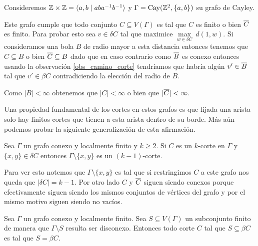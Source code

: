 \documentclass[tesis.tex]{subfiles}
\begin{document}
\begin{ej}
	Consideremos $\mathbb{Z} \times \mathbb{Z} = \langle a,b \mid aba^{-1}b^{-1} \rangle$ y 
	$\Gamma = \text{Cay}(\mathbb{Z}^2, \{ a, b \})$ su grafo de Cayley.
	
	Este grafo cumple que todo conjunto $C \subseteq V(\Gamma)$ es tal que $C$ es finito o bien $\overline C$ es finito.
	Para probar esto sea $v \in \delta C$ tal que
	maximice $\underset{w \in \delta C}{\max} \ d(1,w)$.
	Si consideramos una bola $B$ de radio mayor a esta distancia entonces tenemos que $C \subseteq B$ o bien $\overline C \subseteq B$ dado que en caso contrario como $\overline B$ es conexo entonces usando la observación \ref{obs_camino_corte} tendríamos que habría algún $v' \in \overline B$ tal que $v' \in \beta C$ contradiciendo la elección del radio de $B$.
	
	Como $|B| < \infty$ obtenemos que $|C| < \infty$ o bien que $|\overline C| < \infty$.
\end{ej}

Una propiedad fundamental de los cortes en estos grafos es que fijada una arista solo hay finitos cortes que tienen a esta arista dentro de su borde.	
Más aún podemos probar la siguiente generalización de esta afirmación.

\begin{obs}\label{obs_kCorte_restriccion}
	Sea $\Gamma$ un grafo conexo y localmente finito y $k \ge 2$.
	Si $C$ es un $k$-corte en $\Gamma$ y $\{ x,y  \} \in \delta C$ entonces $\Gamma \setminus \{ x,y \}$ es un $(k-1)$-corte.
	
	Para ver esto notemos que $\Gamma \setminus \{ x,y \}$ es tal que si restringimos $C$ a este grafo nos queda que $|\delta C| = k-1$.
	Por otro lado $C$ y $\overline C$ siguen siendo conexos porque efectivamente siguen siendo los mismos conjuntos de vértices del grafo y por el mismo motivo siguen siendo no vacíos.
\end{obs}



\begin{lema}\label{lema_corte_disconexo_vertices}
	Sea $\Gamma$ un grafo conexo y localmente finito.
	Sea $S \subseteq V(\Gamma)$ un subconjunto finito de manera que $\Gamma \setminus S$ resulta ser disconexo.
	Entonces todo corte $C$ tal que $S \subseteq \beta C$ es tal que $S = \beta C$.
\end{lema}
\end{document}

